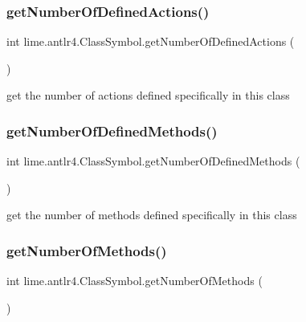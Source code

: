\subsubsection{\texorpdfstring{get\+Number\+Of\+Defined\+Actions()}{getNumberOfDefinedActions()}}
{\footnotesize\ttfamily int lime.\+antlr4.\+Class\+Symbol.\+get\+Number\+Of\+Defined\+Actions (\begin{DoxyParamCaption}{ }\end{DoxyParamCaption})}

get the number of actions defined specifically in this class \mbox{\label{classlime_1_1antlr4_1_1ClassSymbol_a885f4e871c5b078980c39db6385506cb}} 
\subsubsection{\texorpdfstring{get\+Number\+Of\+Defined\+Methods()}{getNumberOfDefinedMethods()}}
{\footnotesize\ttfamily int lime.\+antlr4.\+Class\+Symbol.\+get\+Number\+Of\+Defined\+Methods (\begin{DoxyParamCaption}{ }\end{DoxyParamCaption})}

get the number of methods defined specifically in this class \mbox{\label{classlime_1_1antlr4_1_1ClassSymbol_a3f6bef449ae63455b81793f897a0c7e9}} 
\subsubsection{\texorpdfstring{get\+Number\+Of\+Methods()}{getNumberOfMethods()}}
{\footnotesize\ttfamily int lime.\+antlr4.\+Class\+Symbol.\+get\+Number\+Of\+Methods (\begin{DoxyParamCaption}{ }\end{DoxyParamCaption})}

